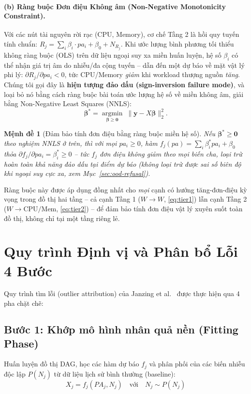 \documentclass[11pt,a4paper]{article}
\newtheorem{proposition}{Mệnh đề}
\begin{document}
\paragraph{(b) Ràng buộc Đơn điệu Không âm (Non-Negative Monotonicity Constraint).}
Với các nút tài nguyên rời rạc (CPU, Memory), cơ chế Tầng 2 là hồi quy tuyến tính chuẩn: $R_j = \sum_i \beta_i \cdot pa_i + \beta_0 + N_{R_j}$. Khi ước lượng bình phương tối thiểu không ràng buộc (OLS) trên dữ liệu ngoại suy xa miền huấn luyện, hệ số $\beta_i$ có thể nhận giá trị âm do nhiễu/đa cộng tuyến -- dẫn đến một dự báo về mặt vật lý phi lý: $\partial R_j / \partial pa_i < 0$, tức CPU/Memory \emph{giảm} khi workload thượng nguồn \emph{tăng}. Chúng tôi gọi đây là \textbf{hiện tượng đảo dấu (sign-inversion failure mode)}, và loại bỏ nó bằng cách ràng buộc bài toán ước lượng hệ số về miền không âm, giải bằng Non-Negative Least Squares (NNLS):
\begin{equation}
\boldsymbol{\beta}^* = \operatorname*{argmin}_{\boldsymbol{\beta} \geq \mathbf{0}} \; \lVert \mathbf{y} - X\boldsymbol{\beta} \rVert_2^2.
\end{equation}
\begin{proposition}[Đảm bảo tính đơn điệu bằng ràng buộc miền hệ số]
Nếu $\boldsymbol{\beta}^* \geq \mathbf{0}$ theo nghiệm NNLS ở trên, thì với mọi $pa_i \geq 0$, hàm $f_j(pa) = \sum_i \beta_i^* pa_i + \beta_0$ thỏa $\partial f_j / \partial pa_i = \beta_i^* \geq 0$ -- tức $f_j$ đơn điệu không giảm theo mọi biến cha, loại trừ hoàn toàn khả năng đảo dấu tại điểm dự báo (không loại trừ được sai số biên độ khi ngoại suy cực xa, xem Mục~\ref{sec:ood-refusal}).
\end{proposition}
Ràng buộc này được áp dụng đồng nhất cho \emph{mọi} cạnh có hướng tăng-đơn-điệu kỳ vọng trong đồ thị hai tầng -- cả cạnh Tầng 1 ($W \to W$, \ref{eq:tier1}) lẫn cạnh Tầng 2 ($W \to \text{CPU/Mem}$, \ref{eq:tier2}) -- để đảm bảo tính đơn điệu vật lý xuyên suốt toàn đồ thị, không chỉ tại một tầng riêng lẻ.

\section{Quy trình Định vị và Phân bổ Lỗi 4 Bước}
\label{sec:bon-buoc}

Quy trình tìm lỗi (outlier attribution) của Janzing et al.~\cite{janzing2019rootcause} được thực hiện qua 4 pha chặt chẽ:

\subsection{Bước 1: Khớp mô hình nhân quả nền (Fitting Phase)}
Huấn luyện đồ thị DAG, học các hàm dự báo $f_j$ và phân phối của các biến nhiễu độc lập $P(N_j)$ từ dữ liệu lịch sử bình thường (baseline):
\begin{equation}
X_j = f_j(PA_j, N_j) \quad \text{với} \quad N_j \sim P(N_j)
\end{equation}
\end{document}
